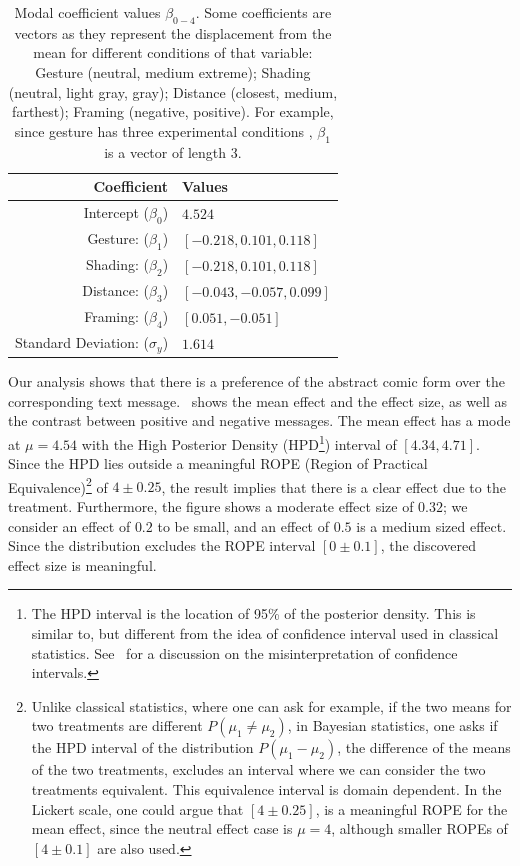 \begin{table}[tb]%
 \centering
 \caption{Modal coefficient values $\beta_{0-4}$. Some coefficients are vectors as they represent the displacement from the mean for different conditions of that variable: Gesture (neutral, medium extreme); Shading (neutral, light gray, gray); Distance (closest, medium, farthest); Framing (negative, positive). For example, since gesture has three experimental conditions , $\beta_1$ is a vector of length 3.}\label{tab:modal values}
 \begin{tabular}{@{}rl@{}} \toprule
  Coefficient                                       & Values                     \\ \midrule
  Intercept ($\beta_0$)                             & $4.524$                    \\
  Gesture:  ($\beta_1$)   & $[-0.218, 0.101, 0.118]$   \\
  Shading:  ($\beta_2$)  & $ [-0.218 , 0.101, 0.118]$ \\
  Distance:  ($\beta_3$) & $[-0.043, -0.057, 0.099]$  \\
  Framing: ($\beta_4$)         & $[ 0.051, -0.051]$         \\
  Standard Deviation: ($\sigma_y$)                   & $1.614$                    \\ \bottomrule
 \end{tabular}
\end{table}




Our analysis shows that there is a preference of the abstract comic form over the corresponding text message.~ shows the mean effect and the effect size, as well as the contrast between positive and negative messages. The mean effect has a mode at $\mu=4.54$ with the High Posterior Density (HPD\footnote{The HPD interval is the location of 95\% of the posterior density. This is similar to, but different from the idea of confidence interval used in classical statistics. See~\textcite{Hoekstra2014} for a discussion on the misinterpretation of confidence intervals.}) interval of $[4.34, 4.71]$. Since the HPD lies outside a meaningful ROPE (Region of Practical Equivalence)\footnote{Unlike classical statistics, where one can ask for example, if the two means for two treatments are different $P(\mu_1\neq \mu_2)$, in Bayesian statistics, one asks if the HPD interval of the distribution $P(\mu_1-\mu_2)$, the difference of the means of the two treatments, excludes an interval where we can consider the two treatments equivalent. This equivalence interval is domain dependent. In the Lickert scale, one could argue that $[4 \pm 0.25]$, is a meaningful ROPE for the mean effect, since the neutral effect case is $\mu=4$, although smaller ROPEs of $[4 \pm 0.1]$ are also used.} of $4 \pm 0.25$, the result implies that there is a clear effect due to the treatment. Furthermore, the figure shows a moderate effect size of $0.32$; we consider an effect of $0.2$ to be small, and an effect of $0.5$ is a medium sized effect. Since the distribution excludes the ROPE interval $[0 \pm 0.1]$, the discovered effect size is meaningful.

